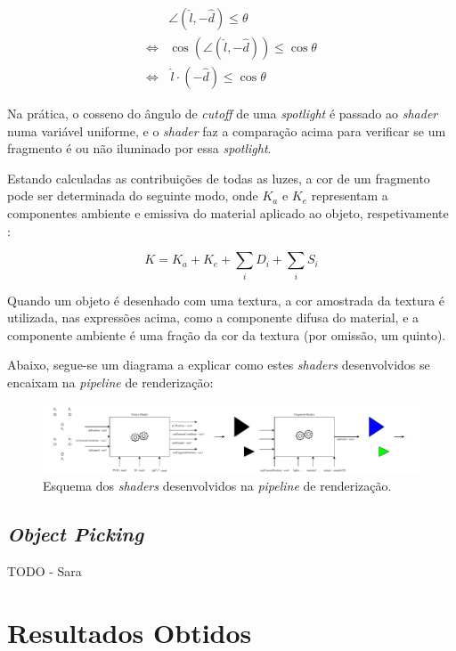 \documentclass[12pt, a4paper]{article}
\begin{document}
\begin{align*}
    & \angle (\hat{l}, -\hat{d}) \le \theta \\
    \Leftrightarrow & \cos \left ( \angle (\hat{l}, -\hat{d}) \right ) \le \cos \theta \\
    \Leftrightarrow & \, \hat{l} \cdot (-\hat{d}) \le \cos \theta
\end{align*}

Na prática, o cosseno do ângulo de \emph{cutoff} de uma \emph{spotlight} é passado ao \emph{shader}
numa variável uniforme, e o \emph{shader} faz a comparação acima para verificar se um fragmento é
ou não iluminado por essa \emph{spotlight}.

Estando calculadas as contribuições de todas as luzes, a cor de um fragmento pode ser determinada do
seguinte modo, onde $K_a$ e $K_e$ representam a componentes ambiente e emissiva do material aplicado
ao objeto, respetivamente \cite{learn-opengl-1} \cite{learn-opengl-3}:

$$
K = K_a + K_e + \sum_{i} D_i + \sum_{i} S_i
$$

Quando um objeto é desenhado com uma textura, a cor amostrada da textura é utilizada, nas
expressões acima, como a componente difusa do material, e a componente ambiente é uma fração da cor
da textura (por omissão, um quinto).

Abaixo, segue-se um diagrama a explicar como estes \emph{shaders} desenvolvidos se encaixam na
\emph{pipeline} de renderização:

\begin{figure}[H]
    \centering
    \includegraphics[width=\textwidth]{res/phase4/Shaders.pdf}
    \caption{Esquema dos \emph{shaders} desenvolvidos na \emph{pipeline} de renderização.}
\end{figure}

\subsection{\emph{Object Picking}}

{\color{red} TODO - Sara}

\section{Resultados Obtidos}
\end{document}
